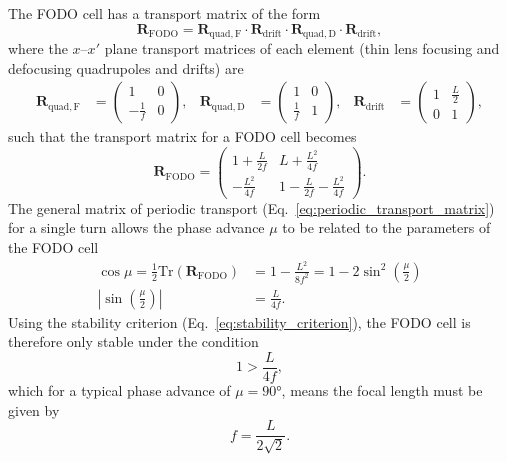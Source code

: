 \documentclass[../main.tex]{subfiles}
\begin{document}
The FODO cell has a transport matrix of the form
\begin{equation}
\boldsymbol{R}_{\mathrm{FODO}} = \boldsymbol{R}_{\mathrm{quad,F}}\cdot\boldsymbol{R}_{\mathrm{drift}}\cdot\boldsymbol{R}_{\mathrm{quad,D}}\cdot\boldsymbol{R}_{\mathrm{drift}},
\label{eq:FODO_transport}    
\end{equation}
where the $x$--$x'$ plane transport matrices of each element (thin lens focusing and defocusing quadrupoles and drifts) are
\begin{align}
\boldsymbol{R}_{\mathrm{quad,F}} &= 
\begin{pmatrix}
1 & 0 \\
-\frac{1}{f} & 0
\end{pmatrix}, & \boldsymbol{R}_{\mathrm{quad,D}} &= 
\begin{pmatrix}
1 & 0 \\
\frac{1}{f} & 1
\end{pmatrix}, & \boldsymbol{R}_{\mathrm{drift}} &= 
\begin{pmatrix}
1 & \frac{L}{2} \\
0 & 1
\end{pmatrix},
\label{eq:FODO_component_matrices}    
\end{align}
such that the transport matrix for a FODO cell becomes
\begin{equation}
\boldsymbol{R}_{\mathrm{FODO}} =
\begin{pmatrix}
1+\frac{L}{2f} & L+\frac{L^{2}}{4f} \\
-\frac{L^{2}}{4f} & 1-\frac{L}{2f}-\frac{L^{2}}{4f}
\end{pmatrix}.
\label{eq:FODO_matrix}
\end{equation}
The general matrix of periodic transport (Eq.~\ref{eq:periodic_transport_matrix}) for a single turn allows the phase advance $\mu$ to be related to the parameters of the FODO cell
\begin{align}
\cos\mu = \frac{1}{2}\boldsymbol{\mathrm{Tr}}\left(\boldsymbol{R}_{\mathrm{FODO}}\right) &= 1-\frac{L^{2}}{8f^{2}} = 1-2\sin^{2}\left(\frac{\mu}{2}\right) \nonumber\\
\left|\sin\left(\frac{\mu}{2}\right)\right| &= \frac{L}{4f}.
\label{eq:phase_advance_FODO}
\end{align}
Using the stability criterion (Eq.~\ref{eq:stability_criterion}), the FODO cell is therefore only stable under the condition
\begin{equation}
1>\frac{L}{4f},
\label{eq:FODO_stability}    
\end{equation}
which for a typical phase advance of $\mu=90$\si{\degree}, means the focal length must be given by
\begin{equation}
f=\frac{L}{2\sqrt{2}}.
\label{eq:FODO_focal_90}    
\end{equation}
\end{document}
